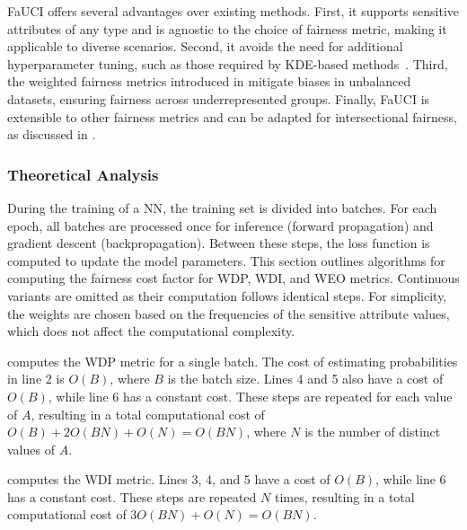 %
\gls{FaUCI} offers several advantages over existing methods.
%
First, it supports sensitive attributes of any type and is agnostic to the choice of fairness metric, making it applicable to diverse scenarios.
%
Second, it avoids the need for additional hyperparameter tuning, such as those required by \gls{KDE}-based methods~\cite{DBLP:conf/nips/ChoHS20}.
%
Third, the weighted fairness metrics introduced in  mitigate biases in unbalanced datasets, ensuring fairness across underrepresented groups.
%
Finally, \gls{FaUCI} is extensible to other fairness metrics and can be adapted for intersectional fairness, as discussed in .



\subsubsection{Theoretical Analysis}
\label{subsubsec:theoretical}
%
During the training of a \gls{NN}, the training set is divided into batches.
%
For each epoch, all batches are processed once for inference (forward propagation) and gradient descent (backpropagation).
%
Between these steps, the loss function is computed to update the model parameters.
%
This section outlines algorithms for computing the fairness cost factor for \gls{WDP}, \gls{WDI}, and \gls{WEO} metrics.
%
Continuous variants are omitted as their computation follows identical steps.
%
For simplicity, the weights are chosen based on the frequencies of the sensitive attribute values, which does not affect the computational complexity.



%
 computes the \gls{WDP} metric for a single batch.
%
The cost of estimating probabilities in line 2 is \(O(B)\), where \(B\) is the batch size.
%
Lines 4 and 5 also have a cost of \(O(B)\), while line 6 has a constant cost.
%
These steps are repeated for each value of \(A\), resulting in a total computational cost of \(O(B) + 2O(BN) + O(N) = O(BN)\), where \(N\) is the number of distinct values of \(A\).



%
 computes the \gls{WDI} metric.
%
Lines 3, 4, and 5 have a cost of \(O(B)\), while line 6 has a constant cost.
%
These steps are repeated \(N\) times, resulting in a total computational cost of \(3O(BN) + O(N) = O(BN)\).



